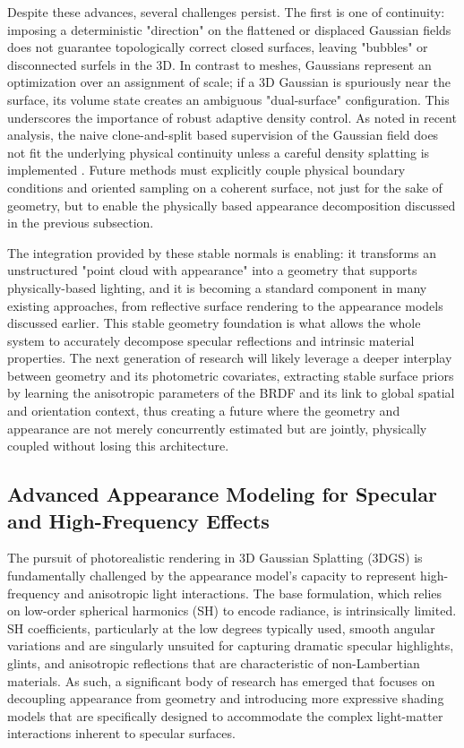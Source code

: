 \documentclass[11pt,a4paper]{article}
\begin{document}
Despite these advances, several challenges persist. The first is one of continuity: imposing a deterministic "direction" on the flattened or displaced Gaussian fields does not guarantee topologically correct closed surfaces, leaving "bubbles" or disconnected surfels in the 3D. In contrast to meshes, Gaussians represent an optimization over an assignment of scale; if a 3D Gaussian is spuriously near the surface, its volume state creates an ambiguous "dual-surface" configuration. This underscores the importance of robust adaptive density control. As noted in recent analysis, the naive clone-and-split based supervision of the Gaussian field does not fit the underlying physical continuity unless a careful density splatting is implemented \cite{arxiv:2404.06109v1,arxiv:2404.10484v1,arxiv:2403.15530v1}. Future methods must explicitly couple physical boundary conditions and oriented sampling on a coherent surface, not just for the sake of geometry, but to enable the physically based appearance decomposition discussed in the previous subsection.

The integration provided by these stable normals is enabling: it transforms an unstructured "point cloud with appearance" into a geometry that supports physically-based lighting, and it is becoming a standard component in many existing approaches, from reflective surface rendering \cite{arxiv:2311.17977v1} to the appearance models discussed earlier. This stable geometry foundation is what allows the whole system to accurately decompose specular reflections and intrinsic material properties. The next generation of research will likely leverage a deeper interplay between geometry and its photometric covariates, extracting stable surface priors by learning the anisotropic parameters of the BRDF and its link to global spatial and orientation context, thus creating a future where the geometry and appearance are not merely concurrently estimated but are jointly, physically coupled without losing this architecture.


\subsection{Advanced Appearance Modeling for Specular and High-Frequency Effects}


The pursuit of photorealistic rendering in 3D Gaussian Splatting (3DGS) is fundamentally challenged by the appearance model's capacity to represent high-frequency and anisotropic light interactions. The base formulation, which relies on low-order spherical harmonics (SH) to encode radiance, is intrinsically limited. SH coefficients, particularly at the low degrees typically used, smooth angular variations and are singularly unsuited for capturing dramatic specular highlights, glints, and anisotropic reflections that are characteristic of non-Lambertian materials. As such, a significant body of research has emerged that focuses on decoupling appearance from geometry and introducing more expressive shading models that are specifically designed to accommodate the complex light-matter interactions inherent to specular surfaces.
\end{document}
